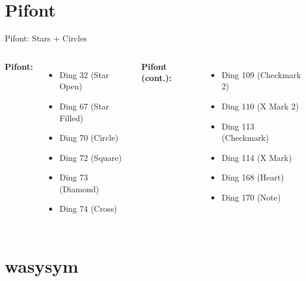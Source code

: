 \documentclass[10pt]{beamer}
\begin{document}
\section{Pifont}

\begin{frame}{Pifont: Stars + Circles}
\begin{columns}
\textbf{Pifont:}
\begin{itemize}
  \item {} Ding 32 (Star Open)
  \item {} Ding 67 (Star Filled)
  \item {} Ding 70 (Circle)
  \item {} Ding 72 (Square)
  \item {} Ding 73 (Diamond)
  \item {} Ding 74 (Cross)
\end{itemize}

\textbf{Pifont (cont.):}
\begin{itemize}
  \item {} Ding 109 (Checkmark 2)
  \item {} Ding 110 (X Mark 2)
  \item {} Ding 113 (Checkmark)
  \item {} Ding 114 (X Mark)
  \item {} Ding 168 (Heart)
  \item {} Ding 170 (Note)
\end{itemize}
\end{columns}
\end{frame}

\section{wasysym}
\end{document}
